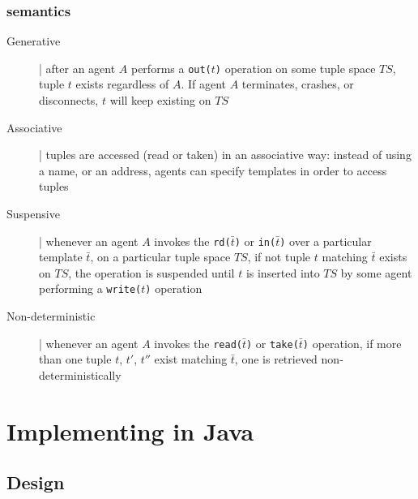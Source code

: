 \documentclass[presentation]{beamer}\mode<presentation>{\usetheme{AMSCesenaPurpleAndGold}}
\begin{document}
\begin{frame}[fragile]
\frametitle{ semantics}
\label{linda-semantics}

\begin{description}
\item[Generative] | after an agent $A$ performs a \texttt{out($t$)} operation on some tuple space $TS$, tuple $t$ \alert{exists} regardless of $A$. 
%
If agent $A$ terminates, crashes, or disconnects, $t$ will keep existing on $TS$

\item[Associative] | tuples are \alert{accessed} (read or taken) in an associative way: instead of using a name, or an address, agents can specify \alert{templates} in order to access tuples

\item[Suspensive] | whenever an agent $A$ invokes the \texttt{rd($\bar{t}$)} or \texttt{in($\bar{t}$)} over a particular template $\bar{t}$, on a particular tuple space $TS$, if not tuple $t$ matching $\bar{t}$ exists on $TS$, the operation is \alert{suspended} until $t$ is inserted into $TS$ by some agent performing a \texttt{write($t$)} operation

\item[Non-deterministic] | whenever an agent $A$ invokes the \texttt{read($\bar{t}$)} or \texttt{take($\bar{t}$)} operation, if more than one tuple $t$, $t'$, $t''$ exist matching  $\bar{t}$, one is retrieved \alert{non-deterministically}

\end{description}

\end{frame}


\section{Implementing \linda{} in Java}

\subsection{Design} 
\end{document}
